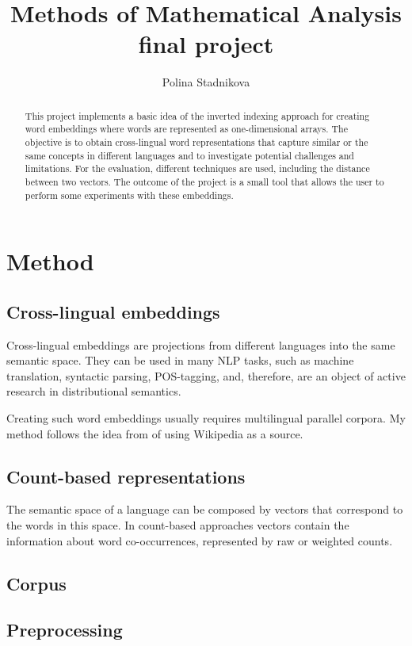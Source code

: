 \documentclass[a4paper]{article}
\title{Methods of Mathematical Analysis final project}
\author{Polina Stadnikova}
\begin{document}
\maketitle
\begin{abstract}
This project implements a basic idea of the inverted indexing approach for creating word embeddings where words are represented as one-dimensional arrays. The objective is to obtain cross-lingual word representations that capture similar or the same concepts in different languages and to investigate potential challenges and limitations. For the evaluation, different techniques are used, including the distance between two vectors. The outcome of the project is a small tool that allows the user to perform some experiments with these embeddings.
\end{abstract}

\section{Method}
\subsection{Cross-lingual embeddings}
Cross-lingual embeddings are projections from different languages into the same semantic space. They can be used in many NLP tasks, such as machine translation, syntactic parsing, POS-tagging, and, therefore, are an object of active research in distributional semantics.\par
Creating such word embeddings usually requires multilingual parallel corpora. My method follows the idea from \cite{b} of using Wikipedia as a source. 
\subsection{Count-based representations}
The semantic space of a language can be composed by vectors that correspond to the words in this space. In count-based approaches vectors contain the information about word co-occurrences, represented by raw  or weighted counts\cite{j}.\\

\subsection{Corpus}
\subsection{Preprocessing} 
\end{document}
